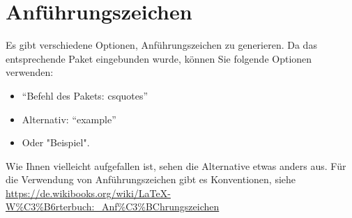 \section{Anführungszeichen}
\label{sec:Anfuehrungszeichen}

Es gibt verschiedene Optionen, Anführungszeichen zu generieren. Da das entsprechende Paket eingebunden wurde, können Sie folgende Optionen verwenden:

\begin{itemize}
	\item \enquote{Befehl des Pakets: csquotes}
	\item Alternativ: ``example''
	\item Oder "Beispiel". 
\end{itemize}

Wie Ihnen vielleicht aufgefallen ist, sehen die Alternative etwas anders aus. Für die Verwendung von Anführungszeichen gibt es Konventionen, siehe \url{https://de.wikibooks.org/wiki/LaTeX-W%C3%B6rterbuch:_Anf%C3%BChrungszeichen}





